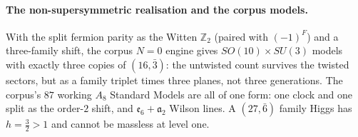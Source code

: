 \paragraph{The non-supersymmetric realisation and the corpus models.}
With the split fermion parity as the Witten $\mathbb Z_2$ (paired with $(-1)^F$) and a three-family shift, the corpus
$N=0$ engine gives $SO(10)\times SU(3)$ models with exactly three copies of $(16,\bar3)$: the untwisted count survives
the twisted sectors, but as a family triplet times three planes, not three generations. The corpus's $87$ working
$A_8$ Standard Models are all of one form: one clock and one split as the order-$2$ shift, and $\mathfrak e_6+\mathfrak a_2$
Wilson lines. A $(27,\bar6)$ family Higgs has $h=\tfrac32>1$ and cannot be massless at level one. 

